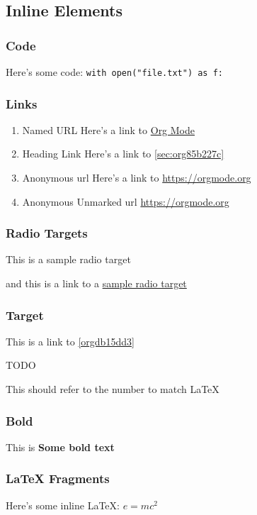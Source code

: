 \documentclass[11pt]{article}
\begin{document}
\subsection{Inline Elements}
\label{sec:orgdab7fa0}

\subsubsection{Code}
\label{sec:org77f7c11}
Here's some code: \texttt{with open("file.txt") as f:}

\subsubsection{Links}
\label{sec:org787fb16}
\begin{enumerate}
\item Named URL
\label{sec:orgc7ffdeb}
Here's a link to \href{https://orgmode.org}{Org Mode}
\item Heading Link
\label{sec:orgedb14b5}
Here's a link to \ref{sec:org85b227c}
\item Anonymous url
\label{sec:orgca1b4d7}
Here's a link to \url{https://orgmode.org}
\item Anonymous Unmarked url
\label{sec:org1645fad}
\url{https://orgmode.org}
\end{enumerate}
\subsubsection{Radio Targets}
\label{sec:orgcf380bf}
This is a \label{org188428c}sample radio target

and this is a link to a \hyperref[org188428c]{sample radio target}

\label{orgdb15dd3}
\subsubsection{Target}
\label{sec:org12abfa3}
This is a link to \ref{orgdb15dd3}

TODO

This should refer to the number to match \LaTeX{}
\subsubsection{Bold}
\label{sec:org0f9027e}
This is \textbf{Some bold text}
\subsubsection{\LaTeX{} Fragments}
\label{sec:org636a523}
Here's some inline \LaTeX{}: \(e=m c^2\)
\end{document}

